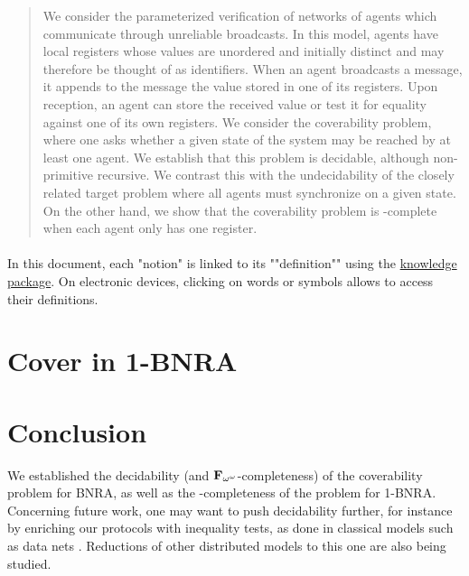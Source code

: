 \documentclass[runningheads]{llncs}
\begin{document}
	\begin{abstract}
	We consider the parameterized verification of networks of agents which communicate through unreliable broadcasts. In this model, agents have local registers whose values are unordered and initially distinct and may therefore be thought of as identifiers.
	When an agent broadcasts a message, it appends to the message the value stored in one of its registers. 
	Upon reception, an agent can store the received value or test it for equality against one of its own registers. 
	We consider the coverability problem, where one asks whether a given state of the system may be reached by at least one agent. We establish that this problem is decidable, although non-primitive recursive. We contrast this with the undecidability of the closely related target problem where all agents must synchronize on a given state. 
	On the other hand, we show that the coverability problem is \NP-complete when each agent only has one register.
	
	 
	\end{abstract}


	
		\paragraph*{}
	\AP In this document, each "notion" is linked to its ""definition"" using the \href{https://www.irif.fr/~colcombe/knowledge_en.html}{knowledge package}. On electronic devices, clicking on words or symbols allows to access their definitions.
	
%
	
	
	
	\section{Cover in 1-BNRA}
	\label{sec:cover-1BNRA}
	
	
%	
%
	\section{Conclusion}
	We established the decidability (and $\mathbf{F}_{\omega^\omega}$-completeness) of the coverability problem for BNRA, as well as the \NP-completeness of the problem for 1-BNRA.
	Concerning future work, one may want to push decidability further, for instance by enriching our protocols
	with inequality tests, as done in classical models such as data nets  \cite{datanetsinequalityfomegaomegaomega}. 
	Reductions of other distributed models to this one are also being studied.
	
\end{document}
